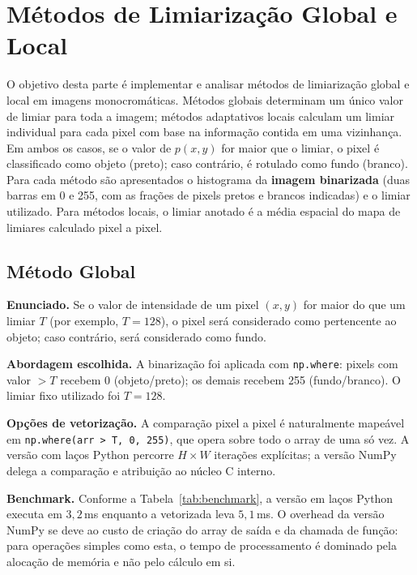 \documentclass[12pt,a4paper]{article}
\newcommand{\campo}[2]{\textbf{#1.} #2\par}
\begin{document}
\section{Métodos de Limiarização Global e Local}
\label{sec:limiarizacao}

O objetivo desta parte é implementar e analisar métodos de limiarização global e local em
imagens monocromáticas. Métodos globais determinam um único valor de limiar para toda a
imagem; métodos adaptativos locais calculam um limiar individual para cada pixel com base
na informação contida em uma vizinhança. Em ambos os casos, se o valor de $p(x,y)$ for maior
que o limiar, o pixel é classificado como objeto (preto); caso contrário, é rotulado como
fundo (branco). Para cada método são apresentados o histograma da \textbf{imagem
binarizada} (duas barras em 0 e 255, com as frações de pixels pretos e brancos indicadas)
e o limiar utilizado. Para métodos locais, o limiar anotado é a média espacial do mapa de
limiares calculado pixel a pixel.

\subsection{Método Global}

\campo{Enunciado}{Se o valor de intensidade de um pixel $(x,y)$ for maior do que um limiar
$T$ (por exemplo, $T=128$), o pixel será considerado como pertencente ao objeto; caso
contrário, será considerado como fundo.}

\campo{Abordagem escolhida}{A binarização foi aplicada com \texttt{np.where}: pixels com
valor $> T$ recebem 0 (objeto/preto); os demais recebem 255 (fundo/branco). O limiar fixo
utilizado foi $T = 128$.}

\campo{Opções de vetorização}{A comparação pixel a pixel é naturalmente mapeável em
\texttt{np.where(arr > T, 0, 255)}, que opera sobre todo o array de uma só vez. A versão
com laços Python percorre $H \times W$ iterações explícitas; a versão NumPy delega a
comparação e atribuição ao núcleo C interno.}

\campo{Benchmark}{Conforme a Tabela~\ref{tab:benchmark}, a versão em laços Python executa
em $3{,}2$\,ms enquanto a vetorizada leva $5{,}1$\,ms. O overhead da versão NumPy se deve
ao custo de criação do array de saída e da chamada de função: para operações simples como
esta, o tempo de processamento é dominado pela alocação de memória e não pelo cálculo em si.}
\end{document}
